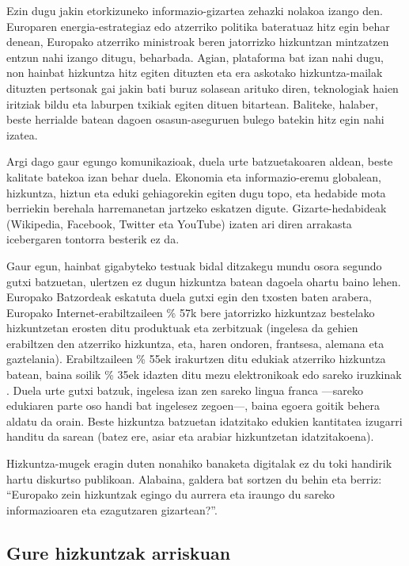 \begin{multicols}{2}
Ezin dugu jakin etorkizuneko informazio-gizartea zehazki nolakoa izango den. Europaren energia-estrategiaz edo atzerriko politika bateratuaz hitz egin behar denean, Europako atzerriko ministroak beren jatorrizko hizkuntzan mintzatzen entzun nahi izango ditugu, beharbada. Agian, plataforma bat izan nahi dugu, non hainbat hizkuntza hitz egiten dituzten eta era askotako hizkuntza-mailak dituzten pertsonak gai jakin bati buruz solasean arituko diren, teknologiak haien iritziak bildu eta laburpen txikiak egiten dituen bitartean. Baliteke, halaber, beste herrialde batean dagoen osasun-aseguruen bulego batekin hitz egin nahi izatea.


Argi dago gaur egungo komunikazioak, duela urte batzuetakoaren aldean, beste kalitate batekoa izan behar duela. Ekonomia eta informazio-eremu globalean, hizkuntza, hiztun eta eduki gehiagorekin egiten dugu topo, eta hedabide mota berriekin berehala harremanetan jartzeko eskatzen digute. Gizarte-hedabideak (Wikipedia, Facebook, Twitter eta YouTube) izaten ari diren arrakasta icebergaren tontorra besterik ez da.

Gaur egun, hainbat gigabyteko testuak bidal ditzakegu mundu osora segundo gutxi batzuetan, ulertzen ez dugun hizkuntza batean dagoela ohartu baino lehen. Europako Batzordeak eskatuta duela gutxi egin den txosten baten arabera, Europako Internet-erabiltzaileen \% 57k bere jatorrizko hizkuntzaz bestelako hizkuntzetan erosten ditu produktuak eta zerbitzuak (ingelesa da gehien erabiltzen den atzerriko hizkuntza, eta, haren ondoren, frantsesa, alemana eta gaztelania). Erabiltzaileen \% 55ek irakurtzen ditu edukiak atzerriko hizkuntza batean, baina soilik \% 35ek idazten ditu mezu elektronikoak edo sareko iruzkinak \cite{BAS-Nota1}.  Duela urte gutxi batzuk, ingelesa izan zen sareko lingua franca —sareko edukiaren parte oso handi bat ingelesez zegoen—, baina egoera goitik behera aldatu da orain. Beste hizkuntza batzuetan idatzitako edukien kantitatea izugarri handitu da sarean (batez ere, asiar eta arabiar hizkuntzetan idatzitakoena).

Hizkuntza-mugek eragin duten nonahiko banaketa digitalak ez du toki handirik hartu diskurtso publikoan. Alabaina, galdera bat sortzen du behin eta berriz: “Europako zein hizkuntzak egingo du aurrera eta iraungo du sareko informazioaren eta ezagutzaren gizartean?”.

\subsection{Gure hizkuntzak arriskuan}


\end{multicols}
